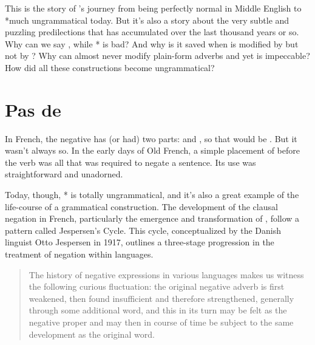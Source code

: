 This is the story of 's journey from being perfectly normal in Middle English to *much ungrammatical today. But it's also a story about the very subtle and puzzling predilections that  has accumulated over the last thousand years or so. Why can we say , while * is bad? And why is it saved when  is modified by  but not by ? Why can  almost never modify plain-form adverbs and yet  is impeccable? How did all these  constructions become ungrammatical?

\section{Pas de }

In French, the negative has (or had) two parts:  and , so that  would be . But it wasn't always so. In the early days of Old French, a simple placement of  before the verb was all that was required to negate a sentence. Its use was straightforward and unadorned.

Today, though, * is totally ungrammatical, and it's also a great example of the life-course of a grammatical construction. The development of the clausal negation in French, particularly the emergence and transformation of , follow a pattern called Jespersen's Cycle. This cycle, conceptualized by the Danish linguist Otto Jespersen in 1917, outlines a three-stage progression in the treatment of negation within languages.

\begin{quote}
    The history of negative expressions in various languages makes us witness the following curious fluctuation: the original negative adverb is first weakened, then found insufficient and therefore strengthened, generally through some additional word, and this in its turn may be felt as the negative proper and may then in course of time be subject to the same development as the original word. \citep[4]{Jespersen1917}%
\end{quote}


